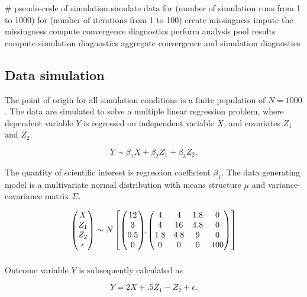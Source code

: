 \documentclass[article]{jss}
\begin{document}
\begin{Code}
# pseudo-code of simulation 
simulate data 
for (number of simulation runs from 1 to 1000)
  for (number of iterations from 1 to 100)
    create missingness
    impute the missingness
    compute convergence diagnostics
    perform analysis
    pool results
    compute simulation diagnostics
aggregate convergence and simulation diagnostics
\end{Code}

\subsection{Data simulation}
The point of origin for all simulation conditions is a finite population of $N=1000$. The data are simulated to solve a multiple linear regression problem, where dependent variable $Y$ is regressed on independent variable $X$, and covariates $Z_1$ and $Z_2$: 

$$Y \sim \beta_1 X + \beta_2 Z_1 + \beta_3 Z_2.$$

The quantity of scientific interest is regression coefficient $\beta_1$. The data generating model is a multivariate normal distribution with means structure $\mu$ and variance-covariance matrix $\Sigma$. 

\begin{align*}
\begin{pmatrix}X\\
Z_{1}\\
Z_{2}\\
\epsilon
\end{pmatrix} \sim  N
\begin{bmatrix}
\begin{pmatrix}
12\\
3\\
0.5\\
0
\end{pmatrix}\!\!,
\begin{pmatrix}
4 & 4 & 1.8 & 0\\
4 & 16 & 4.8 & 0\\
1.8 & 4.8 & 9 & 0\\
0 & 0 & 0 & 100
\end{pmatrix}
\end{bmatrix}\\[2\jot]
\end{align*}

Outcome variable $Y$ is subsequently calculated as 

$$Y =  2X + .5Z_1 - Z_2 + \epsilon .$$
\end{document}
